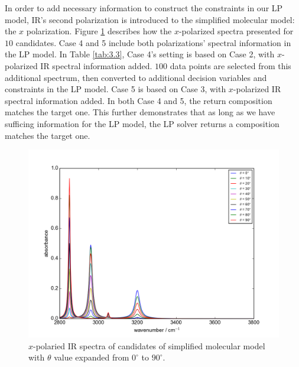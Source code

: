 In order to add necessary information to construct the constraints in our LP model, IR's second polarization is introduced to the simplified molecular model: the $x$ polarization. Figure \ref{fig:3.4} describes how the $x$-polarized spectra presented for $10$ candidates. Case 4 and 5 include both polarizations' spectral information in the LP model. In Table \ref{tab:3.3}, Case 4's setting is based on Case 2, with $x$-polarized IR spectral information added. $100$ data points are selected from this additional spectrum, then converted to additional decision variables and constraints in the LP model. Case 5 is based on Case 3, with $x$-polarized IR spectral information added. In both Case 4 and 5, the return composition matches the target one. This further demonstrates that as long as we have sufficing information for the LP model, the LP solver returns a composition matches the target one. \\ 

\begin{figure}[!ht]
\centering
\includegraphics[scale=0.7]{Figures/Toy_Model_IR_Sine_Projection.png} 
\caption{$x$-polaried IR spectra of candidates of simplified molecular model with $\theta$ value expanded from $0^{\circ}$ to $90^{\circ}$.}  \label{fig:3.4}
\end{figure}

